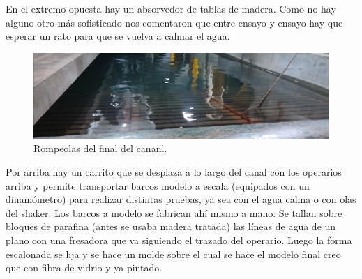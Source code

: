 En el extremo opuesta hay un absorvedor de tablas de madera. Como no hay alguno otro más sofisticado nos comentaron que entre ensayo y ensayo hay que esperar un rato para que se vuelva a calmar el agua.

\begin{figure}[th!]
	\centering
	\includegraphics[width=0.7\linewidth]{Figures/16_06_2025/breakrer}
	\caption{Rompeolas del final del cananl.}
	\label{fig:breakrer}
\end{figure}


Por arriba hay un carrito que se desplaza a lo largo del canal con los operarios arriba y permite transportar barcos modelo a escala (equipados con un dinamómetro) para realizar distintas pruebas, ya sea con el agua calma o con olas del shaker. Los barcos a modelo se fabrican ahí mismo a mano. Se tallan sobre bloques de parafina (antes se usaba madera tratada) las líneas de agua de un plano con una fresadora que va siguiendo el trazado del operario. Luego la forma escalonada se lija y se hace un molde sobre el cual se hace el modelo final creo que con fibra de vidrio y ya pintado. 

